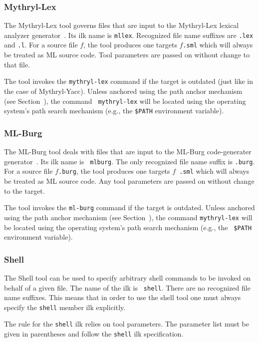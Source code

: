 \subsubsection{Mythryl-Lex}

The Mythryl-Lex tool governs files that are input to the Mythryl-Lex lexical
analyzer generator~\cite{appel89:lex}.  Its ilk name is {\tt mllex}.
Recognized file name suffixes are {\tt .lex} and {\tt .l}.  For a
source file $f$, the tool produces one targets $f${\tt .sml} which
will always be treated as ML source code.  Tool parameters are passed
on without change to that file.

The tool invokes the {\tt mythryl-lex} command if the target is outdated
(just like in the case of Mythryl-Yacc).  Unless anchored using the path
anchor mechanism (see Section~), the command {\tt
mythryl-lex} will be located using the operating system's path search
mechanism (e.g., the {\tt \$PATH} environment variable).

\subsubsection{ML-Burg}

The ML-Burg tool deals with files that are input to the ML-Burg
code-generater generator~\cite{mlburg93}.  Its ilk name is {\tt
mlburg}.  The only recognized file name suffix is {\tt .burg}.  For a
source file $f${\tt .burg}, the tool produces one targets $f${\tt
.sml} which will always be treated as ML source code.  Any tool
parameters are passed on without change to the target.

The tool invokes the {\tt ml-burg} command if the target is outdated.
Unless anchored using the path anchor mechanism (see
Section~), the command {\tt mythryl-lex} will be located
using the operating system's path search mechanism (e.g., the {\tt
\$PATH} environment variable).

\subsubsection{Shell}

The Shell tool can be used to specify arbitrary shell commands to be
invoked on behalf of a given file.  The name of the ilk is {\tt
shell}.  There are no recognized file name suffixes.  This means that
in order to use the shell tool one must always specify the {\tt shell}
member ilk explicitly.

The rule for the {\tt shell} ilk relies on tool parameters.  The
parameter list must be given in parentheses and follow the {\tt shell}
ilk specification.

